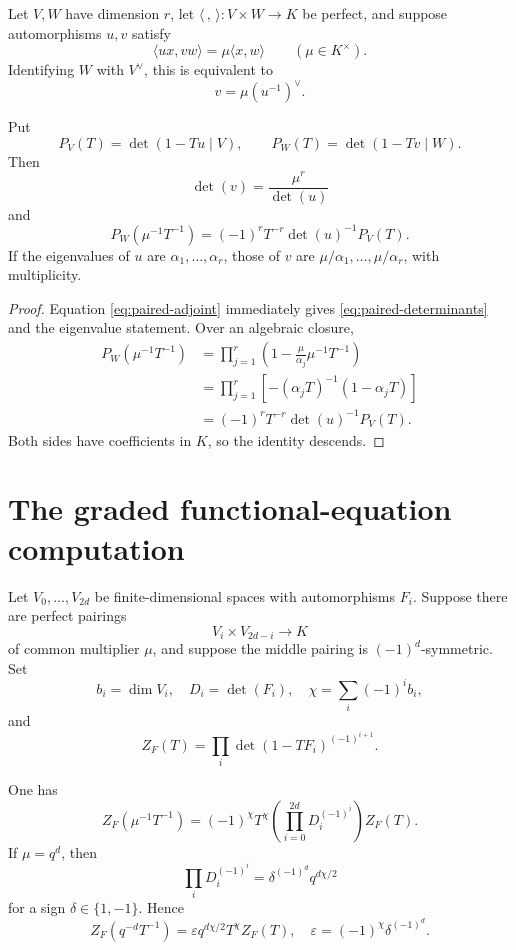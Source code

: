 Let \(V,W\) have dimension \(r\), let
\(\langle\, ,\,\rangle\colon V\times W\to K\) be perfect, and suppose
automorphisms \(u,v\) satisfy
\[
 \langle ux,vw\rangle=\mu\langle x,w\rangle
 \qquad(\mu\in K^\times).
 \tag{2.11}\label{eq:similitude-pair}
\]
Identifying \(W\) with \(V^\vee\), this is equivalent to
\[
 v=\mu(u^{-1})^\vee.
 \tag{2.12}\label{eq:paired-adjoint}
\]

\begin{proposition}
\label{prop:reciprocal-characteristic}
Put
\[
 P_V(T)=\det(1-Tu\mid V),\qquad
 P_W(T)=\det(1-Tv\mid W).
\]
Then
\[
 \det(v)=\frac{\mu^r}{\det(u)}
 \tag{2.13}\label{eq:paired-determinants}
\]
and
\[
 P_W(\mu^{-1}T^{-1})
 =(-1)^rT^{-r}\det(u)^{-1}P_V(T).
 \tag{2.14}\label{eq:paired-polynomials}
\]
If the eigenvalues of \(u\) are \(\alpha_1,\ldots,\alpha_r\), those of
\(v\) are \(\mu/\alpha_1,\ldots,\mu/\alpha_r\), with multiplicity.
\end{proposition}

\begin{proof}
Equation \eqref{eq:paired-adjoint} immediately gives
\eqref{eq:paired-determinants} and the eigenvalue statement.  Over an
algebraic closure,
\[
\begin{aligned}
 P_W(\mu^{-1}T^{-1})
 &=\prod_{j=1}^r
   \left(1-\frac{\mu}{\alpha_j}\mu^{-1}T^{-1}\right)\\
 &=\prod_{j=1}^r
   \left[-(\alpha_jT)^{-1}(1-\alpha_jT)\right]\\
 &=(-1)^rT^{-r}\det(u)^{-1}P_V(T).
\end{aligned}
\]
Both sides have coefficients in \(K\), so the identity descends.
\end{proof}

\section{The graded functional-equation computation}

Let \(V_0,\ldots,V_{2d}\) be finite-dimensional spaces with
automorphisms \(F_i\).  Suppose there are perfect pairings
\[
 V_i\times V_{2d-i}\longrightarrow K
\]
of common multiplier \(\mu\), and suppose the middle pairing is
\((-1)^d\)-symmetric.  Set
\[
 b_i=\dim V_i,\quad D_i=\det(F_i),\quad
 \chi=\sum_i(-1)^ib_i,
\]
and
\[
 Z_F(T)=\prod_i\det(1-TF_i)^{(-1)^{i+1}}.
\]

\begin{theorem}
\label{thm:abstract-functional-equation}
One has
\[
 Z_F(\mu^{-1}T^{-1})
 =(-1)^\chi T^\chi
   \left(\prod_{i=0}^{2d}D_i^{(-1)^i}\right)Z_F(T).
 \tag{2.15}\label{eq:abstract-FE-first}
\]
If \(\mu=q^d\), then
\[
 \prod_iD_i^{(-1)^i}
 =\delta^{(-1)^d}q^{d\chi/2}
 \tag{2.16}\label{eq:alt-det-sign}
\]
for a sign \(\delta\in\{1,-1\}\).  Hence
\[
 Z_F(q^{-d}T^{-1})
 =\varepsilon q^{d\chi/2}T^\chi Z_F(T),
 \quad
 \varepsilon=(-1)^\chi\delta^{(-1)^d}.
 \tag{2.17}\label{eq:abstract-FE-final}
\]
\end{theorem}

